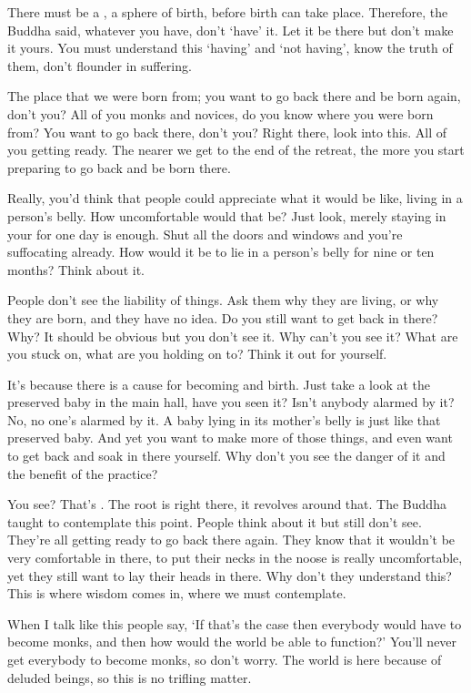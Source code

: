 There must be a , a sphere of birth, before birth can take place. Therefore, the Buddha said, whatever you have, don't `have' it. Let it be there but don't make it yours. You must understand this `having' and `not having', know the truth of them, don't flounder in suffering. 

The place that we were born from; you want to go back there and be born again, don't you? All of you monks and novices, do you know where you were born from? You want to go back there, don't you? Right there, look into this. All of you getting ready. The nearer we get to the end of the retreat, the more you start preparing to go back and be born there. 

Really, you'd think that people could appreciate what it would be like, living in a person's belly. How uncomfortable would that be? Just look, merely staying in your  for one day is enough. Shut all the doors and windows and you're suffocating already. How would it be to lie in a person's belly for nine or ten months? Think about it. 

People don't see the liability of things. Ask them why they are living, or why they are born, and they have no idea. Do you still want to get back in there? Why? It should be obvious but you don't see it. Why can't you see it? What are you stuck on, what are you holding on to? Think it out for yourself. 

It's because there is a cause for becoming and birth. Just take a look at the preserved baby in the main hall, have you seen it? Isn't anybody alarmed by it? No, no one's alarmed by it. A baby lying in its mother's belly is just like that preserved baby. And yet you want to make more of those things, and even want to get back and soak in there yourself. Why don't you see the danger of it and the benefit of the practice? 

You see? That's . The root is right there, it revolves around that. The Buddha taught to contemplate this point. People think about it but still don't see. They're all getting ready to go back there again. They know that it wouldn't be very comfortable in there, to put their necks in the noose is really uncomfortable, yet they still want to lay their heads in there. Why don't they understand this? This is where wisdom comes in, where we must contemplate. 

When I talk like this people say, `If that's the case then everybody would have to become monks, and then how would the world be able to function?' You'll never get everybody to become monks, so don't worry. The world is here because of deluded beings, so this is no trifling matter. 

